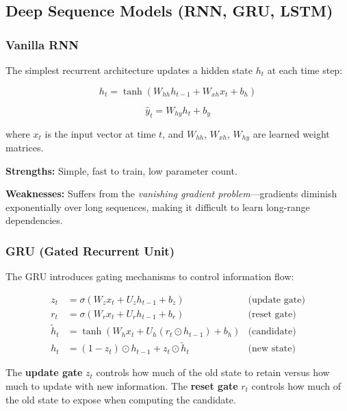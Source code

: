 \subsection{Deep Sequence Models (RNN, GRU, LSTM)}
\subsubsection{Vanilla RNN}

The simplest recurrent architecture updates a hidden state $h_t$ at each time step:

\begin{equation}
h_t = \tanh(W_{hh} h_{t-1} + W_{xh} x_t + b_h)
\end{equation}

\begin{equation}
\hat{y}_t = W_{hy} h_t + b_y
\end{equation}

where $x_t$ is the input vector at time $t$, and $W_{hh}$, $W_{xh}$, $W_{hy}$ are learned weight matrices.

\textbf{Strengths:} Simple, fast to train, low parameter count.

\textbf{Weaknesses:} Suffers from the \emph{vanishing gradient problem}---gradients diminish exponentially over long sequences, making it difficult to learn long-range dependencies.

\subsubsection{GRU (Gated Recurrent Unit)}

The GRU introduces gating mechanisms to control information flow:

\begin{align}
z_t &= \sigma(W_z x_t + U_z h_{t-1} + b_z) & \text{(update gate)} \\
r_t &= \sigma(W_r x_t + U_r h_{t-1} + b_r) & \text{(reset gate)} \\
\tilde{h}_t &= \tanh(W_h x_t + U_h (r_t \odot h_{t-1}) + b_h) & \text{(candidate)} \\
h_t &= (1 - z_t) \odot h_{t-1} + z_t \odot \tilde{h}_t & \text{(new state)}
\end{align}

The \textbf{update gate} $z_t$ controls how much of the old state to retain versus how much to update with new information. The \textbf{reset gate} $r_t$ controls how much of the old state to expose when computing the candidate.

